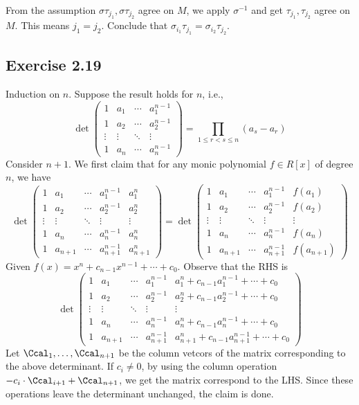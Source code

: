 \documentclass[../Chapter.tex]{subfiles}
\begin{document}
From the assumption $\sigma\tau_{j_1},\sigma\tau_{j_2}$ agree on $M$, we apply $\sigma^{-1}$ and get $\tau_{j_1},\tau_{j_2}$ agree on $M$. This means $j_1=j_2$. Conclude that $\sigma_{i_1}\tau_{j_1}=\sigma_{i_2}\tau_{j_2}$.

\subsection*{Exercise 2.19}

Induction on $n$. Suppose the result holds for $n$, i.e.,
$$
\det\begin{pmatrix}
1           & a_1      & \cdots & a_1^{n-1} \\
1           & a_2     & \cdots & a_2^{n-1} \\
\vdots & \vdots & \ddots & \vdots \\
1          & a_n      & \cdots & a_n^{n-1}
\end{pmatrix}=\prod_{1\leq r<s\leq n}(a_s-a_r)
$$
Consider $n+1$. We first claim that for any monic polynomial $f\in R[x]$ of degree $n$, we have
$$
\det\begin{pmatrix}
1           & a_1       & \cdots & a_1^{n-1}         & a_1^n \\
1           & a_2       & \cdots & a_2^{n-1}        & a_2^n \\
\vdots & \vdots   & \ddots & \vdots              & \vdots \\
1          & a_n        & \cdots & a_n^{n-1}        & a_n^n \\
1          & a_{n+1} & \cdots & a_{n+1}^{n-1} & a_{n+1}^n
\end{pmatrix}=
\det\begin{pmatrix}
1           & a_1        & \cdots & a_1^{n-1}       & f(a_1)\\
1           & a_2       & \cdots & a_2^{n-1}       & f(a_2) \\
\vdots & \vdots   & \ddots & \vdots              & \vdots \\
1          & a_n        & \cdots & a_n^{n-1}        & f(a_n) \\
1          & a_{n+1} & \cdots & a_{n+1}^{n-1} & f(a_{n+1})
\end{pmatrix}
$$
Given $f(x)=x^n+c_{n-1}x^{n-1}+\cdots+c_0$. Observe that the RHS is
$$
\det\begin{pmatrix}
1          & a_1         & \cdots & a_1^{n-1}        & a_1^n+c_{n-1}a_1^{n-1}+\cdots+c_0\\
1          & a_2        & \cdots & a_2^{n-1}        & a_2^n+c_{n-1}a_2^{n-1}+\cdots+c_0 \\
\vdots & \vdots   & \ddots & \vdots              & \vdots \\
1          & a_n        & \cdots & a_n^{n-1}        & a_n^n+c_{n-1}a_n^{n-1}+\cdots+c_0 \\
1          & a_{n+1} & \cdots & a_{n+1}^{n-1} & a_{n+1}^n+c_{n-1}a_{n+1}^{n-1}+\cdots+c_0
\end{pmatrix}$$
Let $\Ccal_1,\ldots,\Ccal_{n+1}$ be the column vetcors of the matrix corresponding to the above determinant. If $c_i\neq 0$, by using the column operation $-c_i\cdot\Ccal_{i+1}+\Ccal_{n+1}$, we get the matrix correspond to the LHS. Since these operations leave the determinant unchanged, the claim is done.
\end{document}
